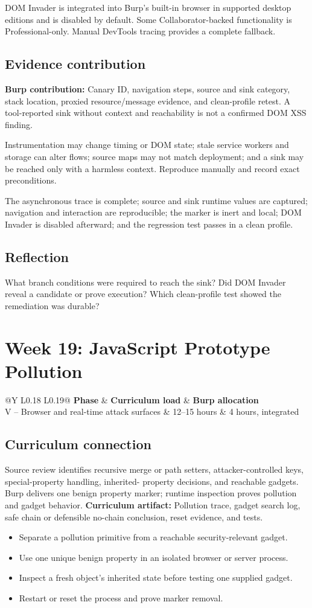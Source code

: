 \documentclass[11pt]{article}
\makeatletter
\newcommand{\weekheader}[5]{%
  \clearpage
  \section{Week #1: #2}
  \begin{tcolorbox}[colback=Navy,colframe=Navy,coltext=white]
    \begin{tabularx}{\linewidth}{@{}Y L{0.18\linewidth} L{0.19\linewidth}@{}}
      \textbf{Phase} & \textbf{Curriculum load} & \textbf{Burp allocation}\\
      #3 & #4 hours & #5 hours, integrated
    \end{tabularx}
  \end{tcolorbox}
}
\newcommand{\weekfield}[2]{%
  \Needspace{5\baselineskip}
  \subsection*{#1}
  #2
}
\newcommand{\curriculumartifact}[1]{\textbf{Curriculum artifact:} #1}
\newcommand{\burpevidence}[1]{\textbf{Burp contribution:} #1}
\makeatother
\begin{document}
\begin{editionbox}
DOM Invader is integrated into Burp's built-in browser in supported desktop
editions and is disabled by default. Some Collaborator-backed functionality is
Professional-only. Manual DevTools tracing provides a complete fallback.
\end{editionbox}

\weekfield{Evidence contribution}{\burpevidence{Canary ID, navigation steps,
source and sink category, stack location, proxied resource/message evidence, and
clean-profile retest.} A tool-reported sink without context and reachability is
not a confirmed DOM XSS finding.}

\begin{troubleshootingbox}
Instrumentation may change timing or DOM state; stale service workers and storage
can alter flows; source maps may not match deployment; and a sink may be reached
only with a harmless context. Reproduce manually and record exact preconditions.
\end{troubleshootingbox}

\begin{checkpoints}
The asynchronous trace is complete; source and sink runtime values are captured;
navigation and interaction are reproducible; the marker is inert and local; DOM
Invader is disabled afterward; and the regression test passes in a clean profile.
\end{checkpoints}

\weekfield{Reflection}{What branch conditions were required to reach the sink?
Did DOM Invader reveal a candidate or prove execution? Which clean-profile test
showed the remediation was durable?}

\weekheader{19}{JavaScript Prototype Pollution}{V -- Browser and real-time attack surfaces}{12--15}{4}

\weekfield{Curriculum connection}{Source review identifies recursive merge or
path setters, attacker-controlled keys, special-property handling, inherited-
property decisions, and reachable gadgets. Burp delivers one benign property
marker; runtime inspection proves pollution and gadget behavior.
\curriculumartifact{Pollution trace, gadget search log, safe chain or defensible
no-chain conclusion, reset evidence, and tests.}}

\begin{objectivebox}
\begin{itemize}
  \item Separate a pollution primitive from a reachable security-relevant gadget.
  \item Use one unique benign property in an isolated browser or server process.
  \item Inspect a fresh object's inherited state before testing one supplied gadget.
  \item Restart or reset the process and prove marker removal.
\end{itemize}
\end{objectivebox}
\end{document}
